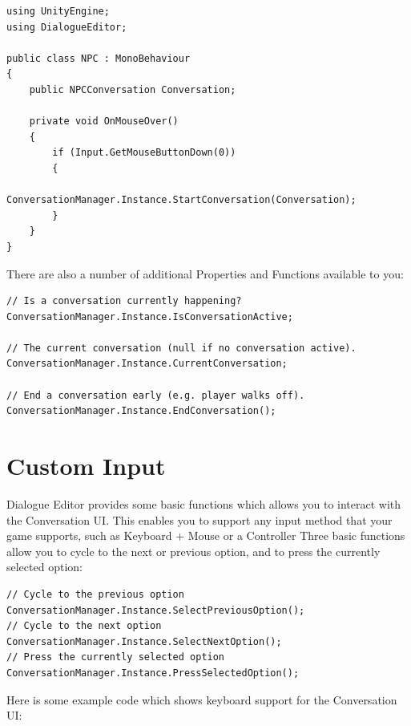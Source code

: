 \documentclass[a4paper,12pt]{article}
\begin{document}
\begin{lstlisting}
using UnityEngine;
using DialogueEditor;

public class NPC : MonoBehaviour
{
	public NPCConversation Conversation;

	private void OnMouseOver()
	{
		if (Input.GetMouseButtonDown(0))
		{
			ConversationManager.Instance.StartConversation(Conversation);
		}
	}
}
\end{lstlisting}
\bigskip


There are also a number of additional Properties and Functions available to you:
\bigskip

\begin{lstlisting}
// Is a conversation currently happening?
ConversationManager.Instance.IsConversationActive;

// The current conversation (null if no conversation active).
ConversationManager.Instance.CurrentConversation;

// End a conversation early (e.g. player walks off).
ConversationManager.Instance.EndConversation();
\end{lstlisting}


\newpage











\section{Custom Input}
\hypertarget{_custominput}{}
Dialogue Editor provides some basic functions which allows you to interact with the Conversation UI. This enables you to support any input method that your game supports, such as Keyboard + Mouse or a Controller
\newline
Three basic functions allow you to cycle to the next or previous option, and to press the currently selected option:
\bigskip

\begin{lstlisting}
// Cycle to the previous option
ConversationManager.Instance.SelectPreviousOption();
// Cycle to the next option
ConversationManager.Instance.SelectNextOption();
// Press the currently selected option
ConversationManager.Instance.PressSelectedOption();
\end{lstlisting}
\bigskip

Here is some example code which shows keyboard support for the Conversation UI:
\bigskip
\end{document}
